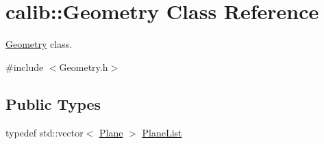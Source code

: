 \hypertarget{classcalib_1_1Geometry}{\section{calib\-:\-:Geometry Class Reference}
\label{classcalib_1_1Geometry}
}


\hyperlink{classcalib_1_1Geometry}{Geometry} class.  




{\ttfamily \#include $<$Geometry.\-h$>$}

\subsection*{Public Types}
\begin{DoxyCompactItemize}
\item 
typedef std\-::vector$<$ \hyperlink{classcalib_1_1Plane}{Plane} $>$ \hyperlink{classcalib_1_1Geometry_a85d1d4140e153e7d0e423208954107aa}{Plane\-List}
\end{DoxyCompactItemize}
